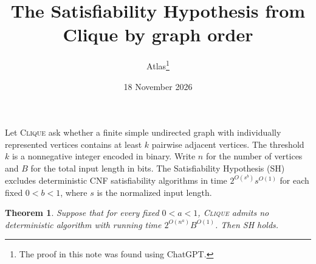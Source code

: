 \documentclass[11pt]{article}
\title{The Satisfiability Hypothesis from Clique by graph order}
\author{Atlas\thanks{The proof in this note was found using ChatGPT.}}
\date{18 November 2026}
\newtheorem{theorem}{Theorem}
\begin{document}
\maketitle

Let \textsc{Clique} ask whether a finite simple undirected graph with
individually represented vertices contains at least \(k\) pairwise
adjacent vertices. The threshold \(k\) is a nonnegative integer encoded
in binary. Write \(n\) for the number of vertices and \(B\) for the total
input length in bits. The Satisfiability Hypothesis (SH) excludes
deterministic CNF satisfiability algorithms in time
\(2^{O(s^b)}s^{O(1)}\) for each fixed \(0<b<1\), where \(s\) is the
normalized input length.

\hypertarget{clique-order-sh-converse}{}
\begin{theorem}
Suppose that for every fixed \(0<a<1\), \textsc{Clique} admits no
deterministic algorithm with running time \(2^{O(n^a)}B^{O(1)}\).
Then SH holds.
\end{theorem}
\end{document}
